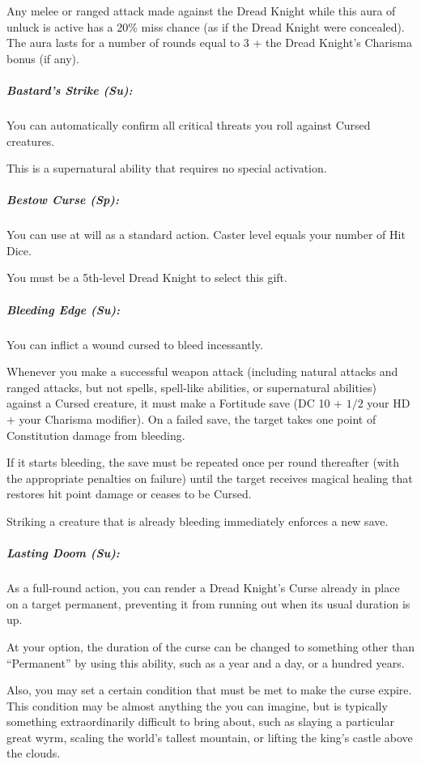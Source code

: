 Any melee or ranged attack made against the Dread Knight while this aura of unluck is active has a 20\% miss chance (as if the Dread Knight were concealed). The aura lasts for a number of rounds equal to 3 + the Dread Knight's Charisma bonus (if any).

\subparagraph{Bastard's Strike (Su):}
You can automatically confirm all critical threats you roll against Cursed creatures.

This is a supernatural ability that requires no special activation.

\subparagraph{Bestow Curse (Sp):} 
You can use  at will as a standard action. Caster level equals your number of Hit Dice.

You must be a 5th-level Dread Knight to select this gift.
\subparagraph{Bleeding Edge (Su):}
You can inflict a wound cursed to bleed incessantly. 

Whenever you make a successful weapon attack (including natural attacks and ranged attacks, but not spells, spell-like abilities, or supernatural abilities) against a Cursed creature, it must make a Fortitude save (DC 10 + $1/2$ your HD + your Charisma modifier). On a failed save, the target takes one point of Constitution damage from bleeding.

If it starts bleeding, the save must be repeated once per round thereafter (with the appropriate penalties on failure) until the target receives magical healing that restores hit point damage or ceases to be Cursed.

Striking a creature that is already bleeding immediately enforces a new save.

\subparagraph{Lasting Doom (Su):}
As a full-round action, you can render a Dread Knight's Curse already in place on a target permanent, preventing it from running out when its usual duration is up.

At your option, the duration of the curse can be changed to something other than ``Permanent'' by using this ability, such as a year and a day, or a hundred years.

Also, you may set a certain condition that must be met to make the curse expire. This condition may be almost anything the you can imagine, but is typically something extraordinarily difficult to bring about, such as slaying a particular great wyrm, scaling the world's tallest mountain, or lifting the king's castle above the clouds.


